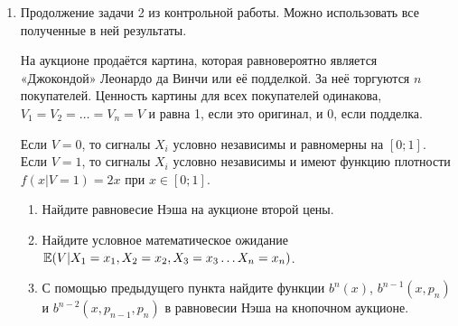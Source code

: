 \begin{enumerate}



\item Продолжение задачи 2 из контрольной работы. Можно использовать все полученные в ней результаты.

На аукционе продаётся картина, которая равновероятно является «Джокондой» Леонардо да Винчи или её подделкой. За неё торгуются $ n $ покупателей. Ценность картины для всех покупателей одинакова, $ V_{1}=V_{2}=\ldots =V_{n}=V $ и равна 1, если это оригинал, и 0, если подделка.

Если $ V=0 $, то сигналы $ X_{i} $ условно независимы и равномерны на $ [0;1] $. Если $ V=1 $, то сигналы $ X_{i} $ условно независимы и имеют функцию плотности $ f(x|V=1)=2x $ при  $x\in [0;1] $.

\begin{enumerate}
\item Найдите равновесие Нэша на аукционе второй цены.
\item Найдите условное математическое ожидание $ \operatorname{\mathbb{E}}(V|X_{1}=x_{1},X_{2}=x_{2},X_{3}=x_{3}\ldots X_{n}=x_{n}) $.
\item С помощью предыдущего пункта найдите функции $ b^{n}(x) $,  $ b^{n-1}(x,p_{n}) $  и $ b^{n-2}(x,p_{n-1},p_{n}) $ в равновесии Нэша на кнопочном аукционе.
\end{enumerate}





\end{enumerate}
